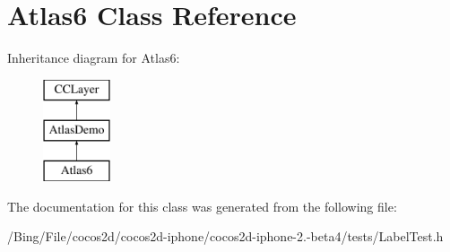 \hypertarget{interface_atlas6}{\section{Atlas6 Class Reference}
\label{interface_atlas6}
}
Inheritance diagram for Atlas6\-:\begin{figure}[H]
\begin{center}
\leavevmode
\includegraphics[height=3.000000cm]{interface_atlas6}
\end{center}
\end{figure}


The documentation for this class was generated from the following file\-:\begin{DoxyCompactItemize}
\item 
/\-Bing/\-File/cocos2d/cocos2d-\/iphone/cocos2d-\/iphone-\/2.-\/beta4/tests/Label\-Test.\-h\end{DoxyCompactItemize}
